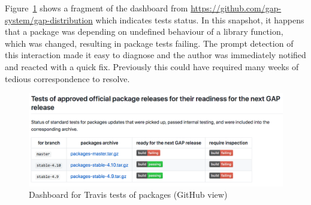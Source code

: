 Figure~\ref{fig:gap-docker-pkg-tests} shows a fragment of the dashboard
from \url{https://github.com/gap-system/gap-distribution} which 
indicates tests status. In this snapshot, it happens that a package
was depending on undefined behaviour of a \GAP library function, which
was changed, resulting in package tests failing. The prompt detection
of this interaction made it easy to diagnose and 
the author was immediately notified and reacted with a quick
fix. Previously this could have required many weeks of tedious
correspondence to resolve.



\begin{figure}[!ht]
    \centering
    \includegraphics[width=\textwidth]{images/gap-docker-pkg-tests}
    \caption{Dashboard for Travis tests of \GAP packages (GitHub view)}
    \label{fig:gap-docker-pkg-tests}
\end{figure}




